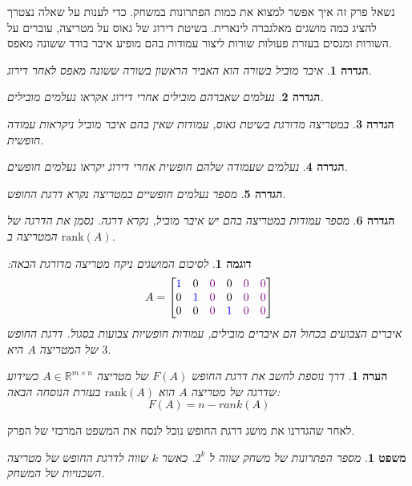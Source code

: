 \documentclass[12pt,leqno]{article}
\theoremstyle{theoremdd}
\newtheorem{definition}{הגדרה}[section]
\newtheorem{theorem}{משפט}[section]
\newtheorem{example}{דוגמה}[section]
\newtheorem{comm}{הערה}[section]
\begin{document}
נשאל פרק זה איך אפשר למצוא את כמות הפתרונות במשחק.
כדי לענות על שאלה נצטרך להציג כמה מושגים מאלגברה לינארית.
בשיטת דירוג של גאוס על מטריצה, עוברים על השורות ומנסים בעזרת פעולות שורות 
ליצור עמודות בהם מופיע איבר בודד ששונה מאפס.
\begin{definition}
    איבר מוביל בשורה הוא האביר הראשון בשורה ששונה מאפס 
    לאחר דירוג.
\end{definition}
\begin{definition}
    נעלמים שאברהם מובילים אחרי דירוג אקראו נעלמים מובילים.
\end{definition}
\begin{definition}
    במטריצה מדורגת בשיטת גאוס, עמודות שאין בהם איבר מוביל 
    ניקראות עמודה חופשית.
\end{definition}
\begin{definition}
    נעלמים שעמודה שלהם חופשית אחרי דירוג יקראו נעלמים חופשים.
\end{definition}
\begin{definition}
    מספר נעלמים חופשיים במטריצה נקרא
    דרגת החופש.
\end{definition}
\begin{definition}
    מספר עמודות במטריצה בהם יש איבר מוביל, נקרא דרגה.
    נסמן את הדרגה של המטריצה ב
    $\mathrm{rank}(A)$.
\end{definition}
\begin{example}
    לסיכום המושגים ניקח מטריצה מדורגת הבאה:
    \[
    A = \begin{bmatrix}
        {\color{blue}1} & 0 &  {\color{violet}0} & 0 &  {\color{violet}0} &  {\color{violet}0}\\
        0 &{\color{blue}1} & {\color{violet}0} & 0  &  {\color{violet}0} &  {\color{violet}0}\\
        0 & 0 &  {\color{violet}0} &{\color{blue}1} &  {\color{violet}0} &  {\color{violet}0}
    \end{bmatrix}
    \]
    איברים הצבועים בכחול הם איברים מובילים,
    עמודות חופשיות צבועות בסגול.
    דרגת החופש של המטריצה 
    $A$
    היא 
    $3$.
\end{example}
\begin{comm}
    דרך נוספת לחשב את דרגת החופש
    $F(A)$
    של מטריצה 
    $A \in\mathbb{R}^{m \times n}$
    כשידוע שדרגה של מטריצה
    $A$
    הוא 
    $\mathrm{rank}(A) $
    בעזרת הנוסחה הבאה:
    \[
        F(A) = n - rank(A)
    \]
\end{comm}
לאחר שהגדרנו את מושג דרגת החופש נוכל לנסח את המשפט המרכזי של הפרק.
\begin{theorem}
    \label{thm:calc-num-sol}
    מספר הפתרונות של משחק 
    שווה ל 
    $2^{k}$.
    כאשר 
    $k$
    שווה לדרגת החופש של מטריצה
    השכנויות של המשחק.
\end{theorem}
\end{document}
